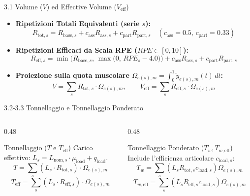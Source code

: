 \documentclass[aspectratio=169, 10pt]{beamer}
\begin{document}
\begin{frame}{3.1 Volume ($V$) ed Effective Volume ($V_{\mathrm{eff}}$)}
    \begin{itemize}
        \item \textbf{Ripetizioni Totali Equivalenti (serie $s$):}
        $$R_{\mathrm{tot}, s} = R_{\mathrm{base}, s} + c_{\mathrm{ass}} R_{\mathrm{ass}, s} + c_{\mathrm{part}} R_{\mathrm{part}, s} \quad (c_{\mathrm{ass}}=0.5, \, c_{\mathrm{part}}=0.33)$$
        \item \textbf{Ripetizioni Efficaci da Scala RPE ($RPE \in [0, 10]$):}
        $$R_{\mathrm{eff}, s} = \min\Big(R_{\mathrm{base}, s}, \, \max\big(0, \, RPE_s - 4.0\big)\Big) + c_{\mathrm{ass}} R_{\mathrm{ass}, s} + c_{\mathrm{part}} R_{\mathrm{part}, s}$$
        \item \textbf{Proiezione sulla quota muscolare $\Omega_{e(s), m} = \int_0^1 \tilde{y}_{e(s), m}(t)\,dt$:}
        $$V = \sum_{s} R_{\mathrm{tot}, s} \cdot \Omega_{e(s), m}, \qquad V_{\mathrm{eff}} = \sum_{s} R_{\mathrm{eff}, s} \cdot \Omega_{e(s), m}$$
    \end{itemize}
\end{frame}

\begin{frame}{3.2-3.3 Tonnellaggio e Tonnellaggio Ponderato}
    \begin{columns}[T]
        \begin{column}{0.48\textwidth}
            \begin{block}{Tonnellaggio ($T$ e $T_{\mathrm{eff}}$)}
                Carico effettivo: $L_s = L_{\mathrm{nom}, s} \cdot \mu_{\mathrm{load}} + q_{\mathrm{load}}$.
                $$T = \sum_{s} (L_s \cdot R_{\mathrm{tot}, s}) \cdot \Omega_{e(s), m}$$
                $$T_{\mathrm{eff}} = \sum_{s} (L_s \cdot R_{\mathrm{eff}, s}) \cdot \Omega_{e(s), m}$$
            \end{block}
        \end{column}
        \begin{column}{0.48\textwidth}
            \begin{block}{Tonnellaggio Ponderato ($T_w, T_{w,\mathrm{eff}}$)}
                Include l'efficienza articolare $c_{\mathrm{load}, s}$:
                $$T_w = \sum_{s} (L_s R_{\mathrm{tot}, s} c_{\mathrm{load}, s}) \Omega_{e(s), m}$$
                $$T_{w,\mathrm{eff}} = \sum_{s} (L_s R_{\mathrm{eff}, s} c_{\mathrm{load}, s}) \Omega_{e(s), m}$$
            \end{block}
        \end{column}
    \end{columns}
\end{frame}
\end{document}
